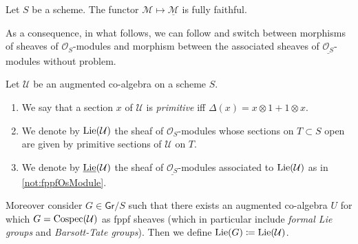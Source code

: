 \begin{prop}
	Let $S$ be a scheme. 
	The functor $\mathcal{M} \mapsto \underline{\mathcal{M}}$
	is fully faithful.
\end{prop}


\begin{rem}[]
	As a consequence, in what follows, we can follow \cite[]{Messing} and switch
	between morphisms of sheaves of $\mathcal{O}_{ S }$-modules and morphism
	between the associated sheaves of $\underline{\mathcal{O}_{ S }}$-modules without problem.
\end{rem}


\begin{defn}[]
	Let $\mathcal{U}$ be an augmented co-algebra on a scheme $S$.
\begin{enumerate}
\item We say that a section $x$ of $\mathcal{U}$ is \emph{primitive} iff
	$\Delta(x) = x \otimes 1 + 1 \otimes x$.

\item We denote by $\operatorname{Lie}(\mathcal{U})$ the sheaf of $\mathcal{O}_{ S }$-modules
	whose sections on $T \subset S$ open are given by
	primitive sections of $\mathcal{U}$ on $T$.

\item We denote by $\underline{\operatorname{Lie}}(\mathcal{U})$ 
	the sheaf of $\underline{\mathcal{O}_{ S }}$-modules
	associated to $\operatorname{Lie}(\mathcal{U})$ as in \cref{not:fppfOsModule}.
\end{enumerate}
	Moreover consider $G \in \mathsf{Gr}/S$ such that there exists an
	augmented co-algebra $U$ for which $G = \operatorname{Cospec}(\mathcal{U})$ as
	fppf sheaves (which in particular include \emph{formal Lie groups} and \emph{Barsott-Tate groups}).
	Then we define $\operatorname{Lie}(G) \coloneqq \operatorname{Lie}(\mathcal{U})$.
\end{defn}


